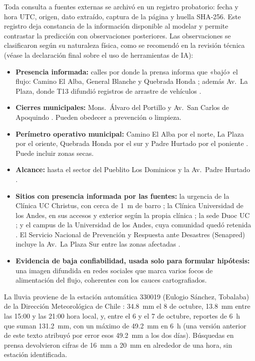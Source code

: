 Toda consulta a fuentes externas se archivó en un registro probatorio: fecha y hora UTC, origen, dato extraído, captura de la página y huella SHA-256. Este registro deja constancia de la información disponible al modelar y permite contrastar la predicción con observaciones posteriores. Las observaciones se clasificaron según su naturaleza física, como se recomendó en la revisión técnica (véase la declaración final sobre el uso de herramientas de IA):
\begin{itemize}
\item \textbf{Presencia informada:} calles por donde la prensa informa que «bajó» el flujo: Camino El Alba, General Blanche y Quebrada Honda \citep{latercera2026}; además Av.\ La Plaza, donde T13 difundió registros de arrastre de vehículos \citep{t13_2026vehiculos}.
\item \textbf{Cierres municipales:} Mons.\ Álvaro del Portillo y Av.\ San Carlos de Apoquindo \citep{eldinamo2026}. Pueden obedecer a prevención o limpieza.
\item \textbf{Perímetro operativo municipal:} Camino El Alba por el norte, La Plaza por el oriente, Quebrada Honda por el sur y Padre Hurtado por el poniente \citep{latercera2026}. Puede incluir zonas secas.
\item \textbf{Alcance:} hasta el sector del Pueblito Los Dominicos y la Av.\ Padre Hurtado \citep{latercera2026}.
\item \textbf{Sitios con presencia informada por las fuentes:} la urgencia de la Clínica UC Christus, con cerca de \SI{1}{m} de barro \citep{cadena3_2026}; la Clínica Universidad de los Andes, en sus accesos y exterior según la propia clínica \citep{radiolasenal2026}; la sede Duoc UC \citep{biobio2026duoc}; y el campus de la Universidad de los Andes, cuya comunidad quedó retenida \citep{cooperativa2026}. El Servicio Nacional de Prevención y Respuesta ante Desastres (Senapred) incluye la Av.\ La Plaza Sur entre las zonas afectadas \citep{eldinamo2026}.
\item \textbf{Evidencia de baja confiabilidad, usada solo para formular hipótesis:} una imagen difundida en redes sociales que marca varios focos de alimentación del flujo, coherentes con los cauces cartografiados.
\end{itemize}
La lluvia proviene de la estación automática 330019 (Eulogio Sánchez, Tobalaba) de la Dirección Meteorológica de Chile \citeyearpar{dmc2026}: \SI{34,8}{mm} el 8 de octubre, \SI{13,8}{mm} entre las 15:00 y las 21:00 hora local, y, entre el 6 y el 7 de octubre, reportes de \SI{6}{h} que suman \SI{131,2}{mm}, con un máximo de \SI{49,2}{mm} en \SI{6}{h} (una versión anterior de este texto atribuyó por error esos \SI{49,2}{mm} a los dos días). Búsquedas en prensa devolvieron cifras de \SI{16}{mm} a \SI{20}{mm} en alrededor de una hora, sin estación identificada.

